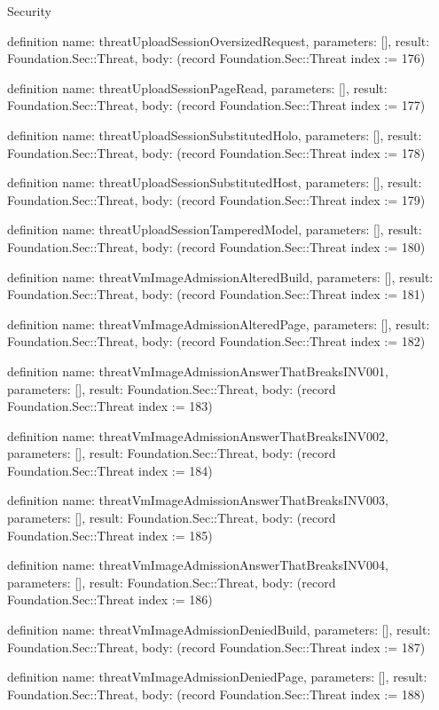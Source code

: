 \begin{lexlean}{Security}
\begin{semanticmodule}
definition{
  name: threatUploadSessionOversizedRequest,
  parameters: [],
  result: Foundation.Sec::Threat,
  body: (record Foundation.Sec::Threat {index := 176})
}

definition{
  name: threatUploadSessionPageRead,
  parameters: [],
  result: Foundation.Sec::Threat,
  body: (record Foundation.Sec::Threat {index := 177})
}

definition{
  name: threatUploadSessionSubstitutedHolo,
  parameters: [],
  result: Foundation.Sec::Threat,
  body: (record Foundation.Sec::Threat {index := 178})
}

definition{
  name: threatUploadSessionSubstitutedHost,
  parameters: [],
  result: Foundation.Sec::Threat,
  body: (record Foundation.Sec::Threat {index := 179})
}

definition{
  name: threatUploadSessionTamperedModel,
  parameters: [],
  result: Foundation.Sec::Threat,
  body: (record Foundation.Sec::Threat {index := 180})
}

definition{
  name: threatVmImageAdmissionAlteredBuild,
  parameters: [],
  result: Foundation.Sec::Threat,
  body: (record Foundation.Sec::Threat {index := 181})
}

definition{
  name: threatVmImageAdmissionAlteredPage,
  parameters: [],
  result: Foundation.Sec::Threat,
  body: (record Foundation.Sec::Threat {index := 182})
}

definition{
  name: threatVmImageAdmissionAnswerThatBreaksINV001,
  parameters: [],
  result: Foundation.Sec::Threat,
  body: (record Foundation.Sec::Threat {index := 183})
}

definition{
  name: threatVmImageAdmissionAnswerThatBreaksINV002,
  parameters: [],
  result: Foundation.Sec::Threat,
  body: (record Foundation.Sec::Threat {index := 184})
}

definition{
  name: threatVmImageAdmissionAnswerThatBreaksINV003,
  parameters: [],
  result: Foundation.Sec::Threat,
  body: (record Foundation.Sec::Threat {index := 185})
}

definition{
  name: threatVmImageAdmissionAnswerThatBreaksINV004,
  parameters: [],
  result: Foundation.Sec::Threat,
  body: (record Foundation.Sec::Threat {index := 186})
}

definition{
  name: threatVmImageAdmissionDeniedBuild,
  parameters: [],
  result: Foundation.Sec::Threat,
  body: (record Foundation.Sec::Threat {index := 187})
}

definition{
  name: threatVmImageAdmissionDeniedPage,
  parameters: [],
  result: Foundation.Sec::Threat,
  body: (record Foundation.Sec::Threat {index := 188})
}


\end{semanticmodule}
\end{lexlean}
